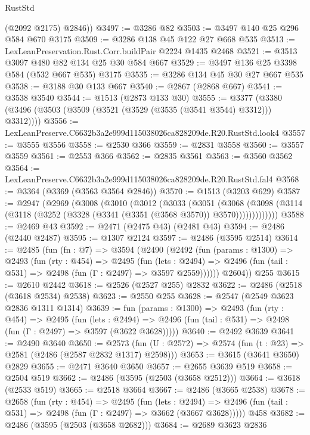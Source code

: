 \begin{lexlean}{RustStd}
\begin{coremodule}
        (@2092 @2175)
        @2846))
@3497 := @3286 @82
@3503 := @3497 @140 @25 @296 @584 @670 @3175
@3509 := @3286 @138 @45 @122 @27 @668 @535
@3513 := LexLeanPreservation.Rust.Corr.buildPair @2224 @1435 @2468
@3521 := @3513 @3097 @480 @82 @134 @25 @30 @584 @667
@3529 := @3497 @136 @25 @3398 @584 (@532 @667 @535) @3175
@3535 := @3286 @134 @45 @30 @27 @667 @535
@3538 := @3188 @30 @133 @667
@3540 := @2867 (@2868 @667)
@3541 := @3538 @3540
@3544 := @1513 (@2873 @133 @30)
@3555 := @3377 (@3380 (@3496 (@3503 (@3509 (@3521 (@3529 (@3535 (@3541 @3544) @3312))) @3312))))
@3556 := LexLeanPreserve.C6632b3a2e999d115038026ca828209de.R20.RustStd.look4
@3557 := @3555 @3556
@3558 := @2530 @366
@3559 := @2831 @3558
@3560 := @3557 @3559
@3561 := @2553 @366
@3562 := @2835 @3561
@3563 := @3560 @3562
@3564 := LexLeanPreserve.C6632b3a2e999d115038026ca828209de.R20.RustStd.fal4
@3568 := @3364 (@3369 (@3563 @3564 @2846))
@3570 := @1513 (@3203 @629)
@3587 := @2947
    (@2969
      (@3008
        (@3010
          (@3012
            (@3033
              (@3051
                (@3068
                  (@3098 (@3114 (@3118 (@3252 (@3328 (@3341 (@3351 (@3568 @3570)) @3570)))))))))))))
@3588 := @2469 @43
@3592 := @2471 (@2475 @43) (@2481 @43)
@3594 := @2486 (@2440 @2487)
@3595 := @1307 @2124
@3597 := @2486 (@3595 @2514)
@3614 := @2485
    (fun (fn : @7) =>
    @3594
      (@2490
        (@2492
          (fun (params : @1300) =>
          @2493
            (fun (rty : @454) =>
            @2495
              (fun (lets : @2494) =>
              @2496 (fun (tail : @531) => @2498 (fun (Γ : @2497) => @3597 @2559))))))
        @2604))
    @255
@3615 := @2610 @2442
@3618 := @2526 (@2527 @255) @2832
@3622 := @2486 (@2518 (@3618 @2534) @2538)
@3623 := @2550 @255
@3628 := @2547 (@2549 @3623 @2836 @1311 @1314)
@3639 := fun (params : @1300) =>
  @2493
    (fun (rty : @454) =>
    @2495
      (fun (lets : @2494) =>
      @2496 (fun (tail : @531) => @2498 (fun (Γ : @2497) => @3597 (@3622 @3628)))))
@3640 := @2492 @3639
@3641 := @2490 @3640
@3650 := @2573 (fun (U : @2572) => @2574 (fun (t : @23) => @2581 (@2486 (@2587 @2832 @1317) @2598)))
@3653 := @3615 (@3641 @3650) @2829
@3655 := @2471 @3640 @3650
@3657 := @2655 @3639 @519
@3658 := @2504 @519
@3662 := @2486 (@3595 (@2503 (@3658 @2512)))
@3664 := @3618 (@2533 @519)
@3665 := @2518 @3664
@3667 := @2486 (@3665 @2538)
@3678 := @2658
    (fun (rty : @454) =>
    @2495
      (fun (lets : @2494) =>
      @2496 (fun (tail : @531) => @2498 (fun (Γ : @2497) => @3662 (@3667 @3628)))))
    @458
@3682 := @2486 (@3595 (@2503 (@3658 @2682)))
@3684 := @2689 @3623 @2836

\end{coremodule}
\end{lexlean}
